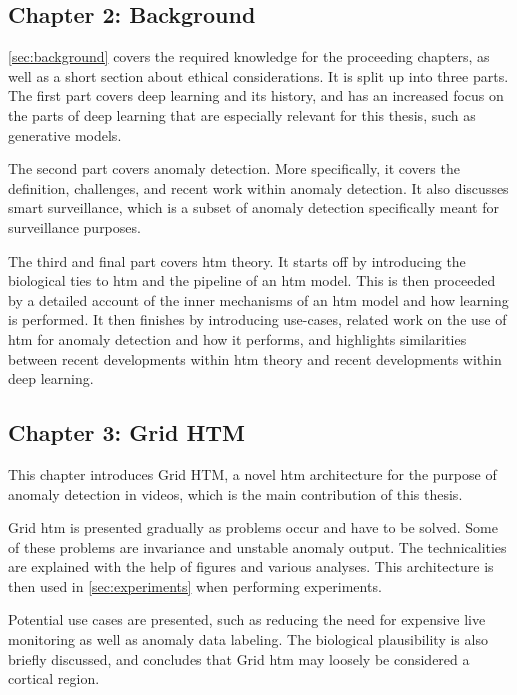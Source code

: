 \subsection*{Chapter 2: Background}
\autoref{sec:background} covers the required knowledge for the proceeding chapters, as well as a short section about ethical considerations. It is split up into three parts. The first part covers deep learning and its history, and has an increased focus on the parts of deep learning that are especially relevant for this thesis, such as generative models.
\par
The second part covers anomaly detection. More specifically, it covers the definition, challenges, and recent work within anomaly detection. It also discusses smart surveillance, which is a subset of anomaly detection specifically meant for surveillance purposes.
\par
The third and final part covers \gls*{htm} theory. It starts off by introducing the biological ties to \gls*{htm} and the pipeline of an \gls*{htm} model. This is then proceeded by a detailed account of the inner mechanisms of an \gls*{htm} model and how learning is performed. It then finishes by introducing use-cases, related work on the use of \gls*{htm} for anomaly detection and how it performs, and highlights similarities between recent developments within \gls*{htm} theory and recent developments within deep learning.
\subsection*{Chapter 3: Grid HTM}
This chapter introduces Grid HTM, a novel \gls*{htm} architecture for the purpose of anomaly detection in videos, which is the main contribution of this thesis.
\par
Grid \gls*{htm} is presented gradually as problems occur and have to be solved. Some of these problems are invariance and unstable anomaly output. The technicalities are explained with the help of figures and various analyses. This architecture is then used in \autoref{sec:experiments} when performing experiments.
\par
Potential use cases are presented, such as reducing the need for expensive live monitoring as well as anomaly data labeling. The biological plausibility is also briefly discussed, and concludes that Grid \gls*{htm} may loosely be considered a cortical region.
